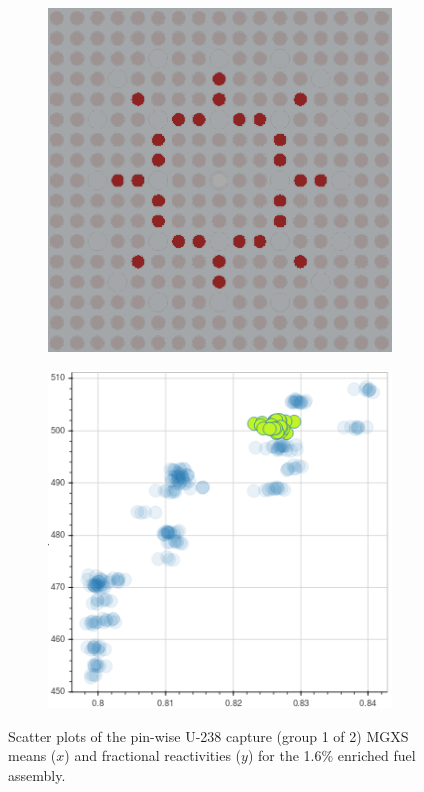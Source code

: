 \begin{figure}[h!]
\begin{subfigure}{0.45\textwidth}
  \caption{}
  \label{fig:chap10-capt-mean-pcm-mgxs-2}
\end{subfigure}
\begin{subfigure}{0.45\textwidth}
  \centering
  \includegraphics[width=0.9\linewidth]{figures/unsupervised/features/assm-16/u238-capt/mean-pcm/geometry-3}
  \caption{}
  \label{fig:chap10-capt-mean-pcm-geom-3}
\end{subfigure}%
\begin{subfigure}{0.45\textwidth}
  \centering
  \includegraphics[width=0.9\linewidth]{figures/unsupervised/features/assm-16/u238-capt/mean-pcm/mgxs-3}
  \caption{}
  \label{fig:chap10-capt-mean-pcm-mgxs-3}
\end{subfigure}
\caption[Clustering of U-238 capture MGXS fractional reactivities]{Scatter plots of the pin-wise U-238 capture (group 1 of 2) \ac{MGXS} means ($x$) and fractional reactivities ($y$) for the 1.6\% enriched fuel assembly.}
\label{fig:chap10-capt-mean-pcm}
\end{figure}

